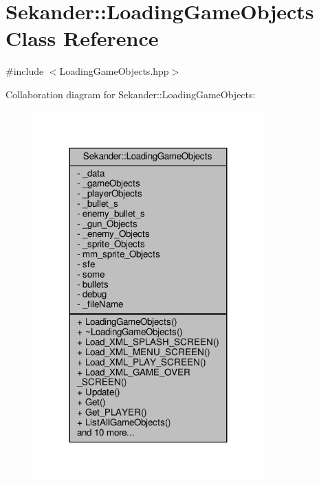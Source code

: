 \hypertarget{classSekander_1_1LoadingGameObjects}{}\section{Sekander\+:\+:Loading\+Game\+Objects Class Reference}
\label{classSekander_1_1LoadingGameObjects}


{\ttfamily \#include $<$Loading\+Game\+Objects.\+hpp$>$}



Collaboration diagram for Sekander\+:\+:Loading\+Game\+Objects\+:
\nopagebreak
\begin{figure}[H]
\begin{center}
\leavevmode
\includegraphics[width=251pt]{classSekander_1_1LoadingGameObjects__coll__graph}
\end{center}
\end{figure}
